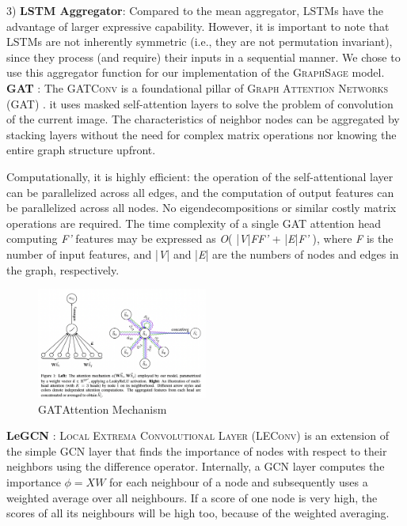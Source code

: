 \documentclass[sigconf, nonacm]{acmart}
\begin{document}
3) \textbf{LSTM Aggregator}:  Compared to the mean aggregator, LSTMs have the advantage of larger expressive capability. However, it is important to note that LSTMs are not inherently symmetric (i.e., they are not permutation invariant), since they process (and require) their inputs in a sequential manner. We chose to use this aggregator function for our implementation of the \textsc{GraphSage} model. \\

\textbf{GAT} : The \textsc{GATConv} is a foundational pillar of \textsc{Graph Attention Networks (GAT)} \cite{Velickovic2017}. it uses masked self-attention layers to solve the problem of convolution of the current image. The characteristics of neighbor nodes can be aggregated by stacking layers without the need for complex matrix operations nor knowing the entire graph structure upfront.

Computationally, it is highly efficient: the operation of the self-attentional layer can be parallelized across all edges, and the computation of output features can be parallelized across all nodes. No eigendecompositions or similar costly matrix operations are required. The time complexity of a single \textsc{GAT} attention head computing \textit{F'} features may be expressed as \textit{O}( |\textit{V}|\textit{FF'} + |\textit{E}|\textit{F'} ), where \textit{F} is the number of input features, and |\textit{V}| and |\textit{E}| are the numbers of nodes and edges in the graph, respectively. 

\begin{figure}[h]
    \centering
    \includegraphics[width=0.5\textwidth]{GAT.png} 
    \caption{\textsc{GAT}Attention Mechanism \cite{Velickovic2017}}
    \label{fig:GAT}
\end{figure}

\textbf{Le\textsc{GCN}} : \textsc{Local Extrema Convolutional Layer (\textsc{LEConv})} \cite{LeConvPaper} is an extension of the simple \textsc{GCN} layer that finds the importance of nodes with respect to their neighbors using the difference operator. Internally, a \textsc{GCN} layer computes the importance $\phi = XW$ for each neighbour of a node and subsequently uses a weighted average over all neighbours. If a score of one node is very high, the scores of all its neighbours will be high too, because of the weighted averaging. 
\end{document}
